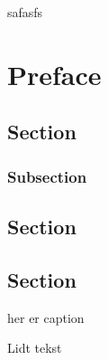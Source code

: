 \documentclass[danish,oldfontcommands]{ermreport}
\begin{document}
\coverpage
  \frontmatter
  \titlepage
  \trustpage
\begin{resume}
 safasfs
\end{resume}
\chapter{Preface}
\tableofcontents
{}
\section{Section}
\subsection{Subsection}
\section[Toc]{Section}
\section[Toc2][head]{Section}
\appendix
{}
\begin{boks}
\caption{her er caption}
Lidt tekst
\end{boks}
\end{document}
